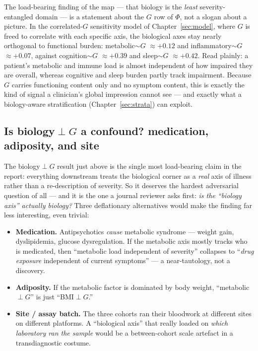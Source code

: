 \begin{keyresult}
The load-bearing finding of the map --- that biology is the \emph{least} severity-entangled domain --- is a
statement about the $G$ row of $\Phi$, not a slogan about a picture. In the correlated-$G$ sensitivity model
of Chapter~\ref{sec:model}, where $G$ is freed to correlate with each specific axis, the biological axes stay
nearly orthogonal to functional burden: metabolic$\sim$$G$ $\approx +0.12$ and inflammatory$\sim$$G$ $\approx
+0.07$, against cognition$\sim$$G$ $\approx +0.39$ and sleep$\sim$$G$ $\approx +0.42$. Read plainly: a
patient's metabolic and immune load is almost independent of how impaired they are overall, whereas cognitive
and sleep burden partly track impairment. Because $G$ carries functioning content only and no symptom content,
this is exactly the kind of signal a clinician's global impression cannot see --- and exactly what a
biology-aware stratification (Chapter~\ref{sec:strata}) can exploit.
\end{keyresult}

\subsection{Is biology$\perp$$G$ a confound? medication, adiposity, and site}
\label{sub:confound}
The biology$\perp$$G$ result just above is the single most load-bearing claim in the report:
everything downstream treats the biological corner as a \emph{real} axis of illness rather than a re-description
of severity. So it deserves the hardest adversarial question of all --- and it is the one a journal reviewer
asks first: \emph{is the ``biology axis'' actually biology?} Three deflationary alternatives would make the
finding far less interesting, even trivial:

\begin{itemize}\setlength{\itemsep}{1pt}
  \item \textbf{Medication.} Antipsychotics \emph{cause} metabolic syndrome --- weight gain, dyslipidemia,
  glucose dysregulation. If the metabolic axis mostly tracks who is medicated, then ``metabolic load independent
  of severity'' collapses to ``\emph{drug exposure} independent of current symptoms'' --- a near-tautology, not a
  discovery.
  \item \textbf{Adiposity.} If the metabolic factor is dominated by body weight, ``metabolic$\perp$$G$'' is just
  ``BMI$\perp$$G$.''
  \item \textbf{Site / assay batch.} The three cohorts ran their bloodwork at different sites on different
  platforms. A ``biological axis'' that really loaded on \emph{which laboratory ran the sample} would be a
  between-cohort scale artefact in a transdiagnostic costume.
\end{itemize}

